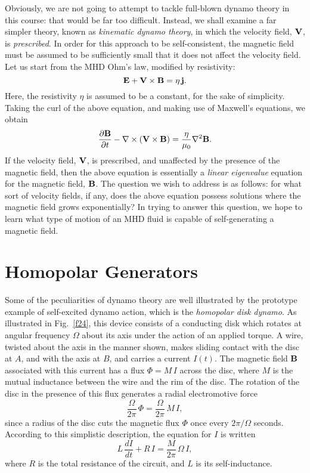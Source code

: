 Obviously, we are not going to attempt to tackle full-blown dynamo
theory in this course: that would be far too difficult. Instead, we shall examine a
far simpler theory, known as {\em kinematic dynamo theory}, in which
the velocity field, ${\bf V}$, is {\em prescribed}.
In order for this approach to be self-consistent, the magnetic field must be
assumed to be sufficiently small that it does not affect the velocity field.
Let us start from the MHD Ohm's law, modified by resistivity:
\begin{equation}
{\bf E} + {\bf V} \times{\bf B} = \eta\,{\bf j}.
\end{equation}
Here, the resistivity $\eta$ is assumed to be a constant, for the sake
of simplicity. Taking the curl of the above equation, and making use
of Maxwell's equations, we obtain
\begin{equation}
\frac{\partial {\bf B}}{\partial t} - \nabla\times({\bf V}\times{\bf B})
=  \frac{\eta}{\mu_0}\nabla^2{\bf B}.
\end{equation}
If the velocity field, ${\bf V}$, is prescribed, and unaffected by the
presence of the magnetic field, then the above equation is
essentially a {\em linear eigenvalue}\/ equation for the magnetic field, ${\bf B}$.
The question we wish to address is as follows: for what sort
of velocity fields, if any, does the above equation possess solutions
where the magnetic field grows exponentially? In trying to answer this question,
we hope to learn what type of motion of an MHD fluid is capable of
self-generating 
a magnetic field. 

\section{Homopolar Generators}
Some of the peculiarities of dynamo theory are well illustrated
by the prototype example of self-excited dynamo action, which is the
{\em homopolar disk dynamo}. As illustrated in Fig.~\ref{f24}, this device
consists of a conducting disk which rotates at angular
frequency ${\Omega}$  about its axis under the
action of an applied torque. A wire, twisted about the axis in the
manner shown, makes sliding contact with the disc at $A$, and with
the axis at $B$, and carries a current $I(t)$. The magnetic field
${\bf B}$ associated with this current has a flux ${\Phi} = M\,I$
across the disc, where $M$ is the mutual inductance between the wire and the
rim of the disc. The rotation of the disc in the
presence of this flux generates a radial electromotive
force
\begin{equation}
\frac{{\Omega}}{2\pi}\,{\Phi} = \frac{{\Omega}}{2\pi}\,M\,I,
\end{equation}
since a radius of the disc cuts the magnetic flux ${\Phi}$ once
every $2\pi/{\Omega}$ seconds. According to this simplistic
description, the equation for $I$ is written
\begin{equation}\label{e5.85}
L\,\frac{dI}{dt} + R\,I = \frac{M}{2\pi}\,{\Omega}\,I,
\end{equation}
where $R$ is the total resistance of the circuit, and $L$ is its
self-inductance. 

